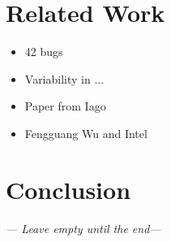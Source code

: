 \documentclass[a4paper,11pt]{article}
\begin{document}
\newpage
\section{Related Work}

\begin{itemize}
    \item 42 bugs
    \item Variability in ...
    \item Paper from Iago
    \item Fengguang Wu and Intel
\end{itemize}



\newpage
\section{Conclusion}
\emph{--- Leave empty until the end---}




\newpage


\end{document}
